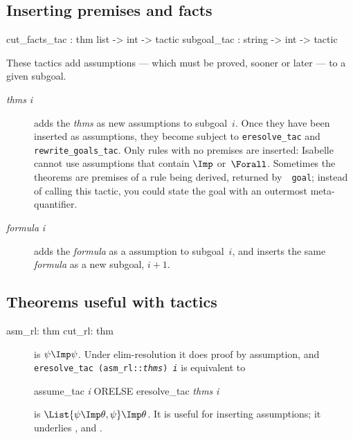 \subsection{Inserting premises and facts}\label{cut_facts_tac}
\begin{ttbox} 
cut_facts_tac : thm list -> int -> tactic
subgoal_tac   :   string -> int -> tactic
\end{ttbox}
These tactics add assumptions --- which must be proved, sooner or later ---
to a given subgoal.
\begin{description}
\item[ {\it thms} {\it i}] 
  adds the {\it thms} as new assumptions to subgoal~$i$.  Once they have
  been inserted as assumptions, they become subject to {\tt eresolve_tac}
  and {\tt rewrite_goals_tac}.  Only rules with no premises are inserted:
  Isabelle cannot use assumptions that contain $\Imp$ or~$\Forall$.  Sometimes
  the theorems are premises of a rule being derived, returned by~{\tt
    goal}; instead of calling this tactic, you could state the goal with an
  outermost meta-quantifier.

\item[ {\it formula} {\it i}] 
adds the {\it formula} as a assumption to subgoal~$i$, and inserts the same
{\it formula} as a new subgoal, $i+1$.
\end{description}


\subsection{Theorems useful with tactics}
\begin{ttbox} 
asm_rl: thm 
cut_rl: thm 
\end{ttbox}
\begin{description}
\item[] 
is $\psi\Imp\psi$.  Under elim-resolution it does proof by assumption, and
\hbox{\tt eresolve_tac (asm_rl::{\it thms}) {\it i}} is equivalent to
\begin{ttbox} 
assume_tac {\it i}  ORELSE  eresolve_tac {\it thms} {\it i}
\end{ttbox}

\item[] 
is $\List{\psi\Imp\theta,\psi}\Imp\theta$.  It is useful for inserting
assumptions; it underlies , 
and .
\end{description}


